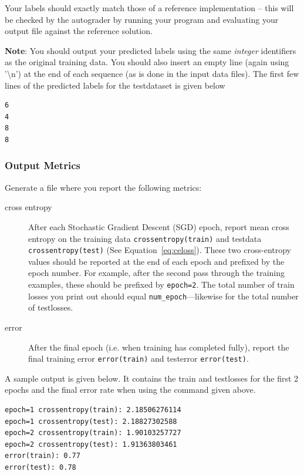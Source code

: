 \documentclass[11pt]{exam}
\numberwithin{equation}{section} %
\numberwithin{figure}{section} %
\numberwithin{table}{section} %
\newcommand{\ntset}{test}
\begin{document}
Your labels should exactly match those of a reference implementation -- this will be checked by the autograder by running your program and evaluating your output file against the reference solution.

\textbf{Note}: You should output your predicted labels using the same \emph{integer} identifiers as the original training data. You should also insert an empty line (again using ’\textbackslash n’) at the end of each sequence (as is done in the input data files). The first few lines of the predicted labels for the \ntset\thinspace dataset is given below
\\

\begin{lstlisting}
6
4
8
8
\end{lstlisting}


\subsubsection{Output Metrics} \label{metrics}
Generate a file where you report the following metrics: 

\begin{description}
\item[cross entropy] After each Stochastic Gradient Descent (SGD) epoch, report mean cross entropy on the training data \lstinline{crossentropy(train)} and \ntset\thinspace data \texttt{crossentropy(\ntset)} (See Equation~\ref{eq:celoss}). These two cross-entropy values should be reported at the end of each epoch and prefixed by the epoch number. For example, after the second pass through the training examples, these should be prefixed by \lstinline{epoch=2}. The total number of train losses you print out should equal \texttt{num\_epoch}---likewise for the total number of \ntset\thinspace losses.
\item[error] After the final epoch (i.e. when training has completed fully), report the final training error \lstinline{error(train)} and \ntset\thinspace error \texttt{error(\ntset)}. 
\end{description}

A sample output is given below. It contains the train and \ntset\thinspace losses for the first 2 epochs and the final error rate when using the command given above.

\begin{lstlisting}
epoch=1 crossentropy(train): 2.18506276114
epoch=1 crossentropy(test): 2.18827302588
epoch=2 crossentropy(train): 1.90103257727
epoch=2 crossentropy(test): 1.91363803461
error(train): 0.77
error(test): 0.78
\end{lstlisting}
\end{document}
